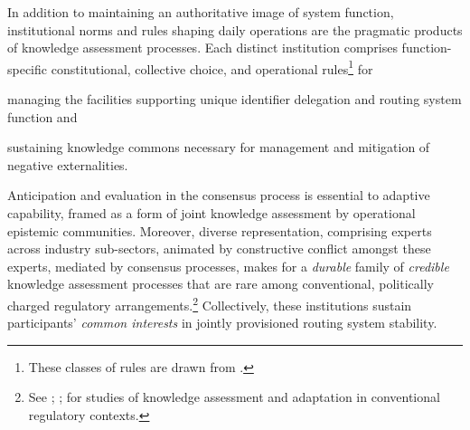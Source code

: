 \documentclass[12pt,journal,compsoc,letterpaper,onecolumn,twoside]{IEEEtran}
\begin{document}
In addition to maintaining an authoritative image of system function,
institutional norms and rules shaping daily operations are the pragmatic products of knowledge assessment processes.
%
Each distinct institution comprises function-specific
constitutional, 
collective choice, and operational rules\footnote{These classes of rules are
  drawn from .} for 
\begin{inparaenum}[\itshape 1\upshape)]
  \item managing the facilities supporting unique identifier
    delegation and routing system function and 
  \item sustaining knowledge commons necessary for management and
    mitigation of negative externalities.
\end{inparaenum}
%
%
Anticipation and evaluation in the consensus process is essential to adaptive
capability, framed as a form of joint knowledge assessment by
operational epistemic communities.
%
Moreover, diverse representation, comprising experts across industry
sub-sectors, animated by constructive conflict amongst these experts,
mediated by consensus processes, makes for a \emph{durable} family of
\emph{credible} knowledge 
assessment processes that are
rare among conventional, politically 
charged regulatory 
arrangements.\footnote{See ;
  ;  for
  studies of knowledge 
  assessment and adaptation in conventional regulatory contexts.}
%
Collectively, these institutions sustain participants'
\emph{common interests} in jointly provisioned routing system stability.
%
\end{document}
